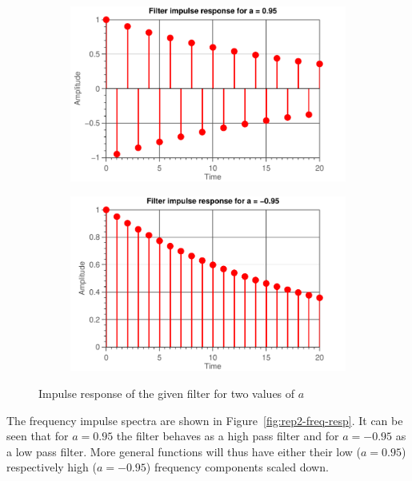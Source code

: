 \documentclass[11pt,titlepage]{report}
\begin{document}
\begin{figure}[H]
	\centering
	\begin{subfigure}{0.49\textwidth}
		\includegraphics[width=\textwidth]{../../deliverable-7-resources/figures/ass-1/report-2/ass-1-report-2-a-positive.pdf}
	\end{subfigure}
	\begin{subfigure}{0.49\textwidth}
		\includegraphics[width=\textwidth]{../../deliverable-7-resources/figures/ass-1/report-2/ass-1-report-2-a-negative.pdf}
	\end{subfigure}
	\caption{Impulse response of the given filter for two values of $a$}
	\label{fig:rep2-time-resp}
\end{figure}

The frequency impulse spectra are shown in Figure~\ref{fig:rep2-freq-resp}. It can be seen that for $a=0.95$ the filter behaves as a high pass filter and for $a=-0.95$ as a low pass filter. More general functions will thus have either their low ($a=0.95$) respectively high ($a=-0.95$) frequency components scaled down.
\end{document}
